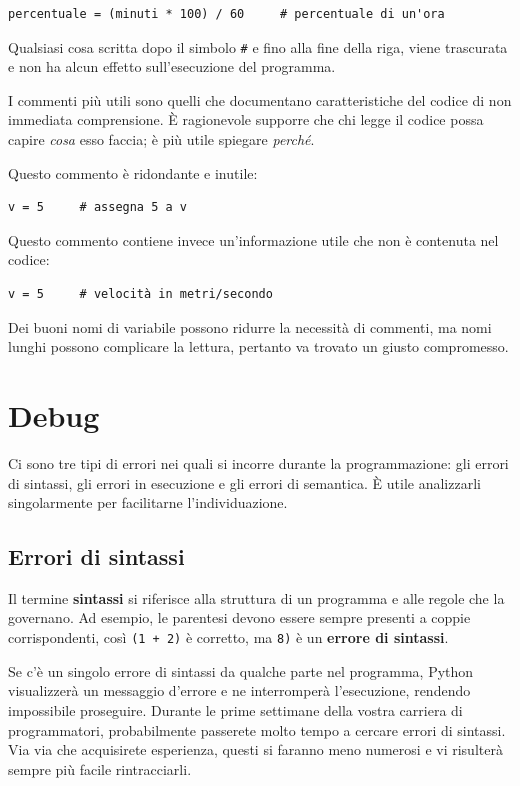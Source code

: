 \documentclass[10pt]{book}
\begin{document}
\begin{verbatim}
percentuale = (minuti * 100) / 60     # percentuale di un'ora
\end{verbatim}
%
Qualsiasi cosa scritta dopo il simbolo {\tt \#} e fino alla fine della riga, viene trascurata e non ha alcun effetto sull'esecuzione del programma. 

I commenti più utili sono quelli che documentano caratteristiche del codice di non immediata comprensione. È ragionevole supporre che chi legge il codice possa capire {\em cosa} esso faccia; è più utile spiegare {\em perché}.

Questo commento è ridondante e inutile:

\begin{verbatim}
v = 5     # assegna 5 a v
\end{verbatim}
%
Questo commento contiene invece un'informazione utile che non è contenuta nel codice:

\begin{verbatim}
v = 5     # velocità in metri/secondo 
\end{verbatim}
%
Dei buoni nomi di variabile possono ridurre la necessità di commenti, ma nomi lunghi possono complicare la lettura, pertanto va trovato un giusto compromesso.


\section{Debug}

Ci sono tre tipi di errori nei quali si incorre durante la programmazione: gli errori di sintassi, gli errori in esecuzione e gli errori di semantica. È utile analizzarli singolarmente per facilitarne l'individuazione.

\subsection{Errori di sintassi}

Il termine {\bf sintassi} si riferisce alla struttura di un programma e alle regole che la governano. Ad esempio, le parentesi devono essere sempre presenti a coppie corrispondenti, così {\tt (1 + 2)} è corretto, ma {\tt 8)} è un {\bf errore di sintassi}.

Se c'è un singolo errore di sintassi da qualche parte nel programma, Python visualizzerà un messaggio d'errore e ne interromperà l'esecuzione, rendendo impossibile proseguire. Durante le prime settimane della vostra carriera di programmatori, probabilmente passerete molto tempo a cercare errori di sintassi. Via via che acquisirete esperienza, questi si faranno meno numerosi e vi risulterà sempre più facile rintracciarli.
\end{document}
